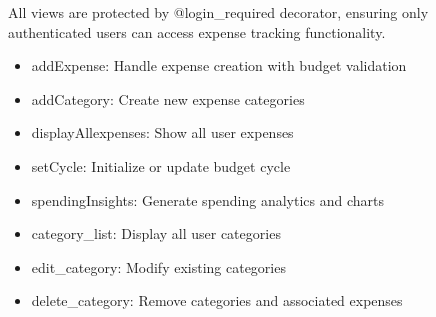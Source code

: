\documentclass[letterpaper,10pt,english]{sphinxmanual}
\begin{document}
\sphinxAtStartPar
All views are protected by @login\_required decorator, ensuring only
authenticated users can access expense tracking functionality.
\begin{description}
\begin{itemize}
\item {} 
\sphinxAtStartPar
addExpense: Handle expense creation with budget validation

\item {} 
\sphinxAtStartPar
addCategory: Create new expense categories

\item {} 
\sphinxAtStartPar
displayAllexpenses: Show all user expenses

\item {} 
\sphinxAtStartPar
setCycle: Initialize or update budget cycle

\item {} 
\sphinxAtStartPar
spendingInsights: Generate spending analytics and charts

\item {} 
\sphinxAtStartPar
category\_list: Display all user categories

\item {} 
\sphinxAtStartPar
edit\_category: Modify existing categories

\item {} 
\sphinxAtStartPar
delete\_category: Remove categories and associated expenses

\end{itemize}

\end{description}
\end{document}

